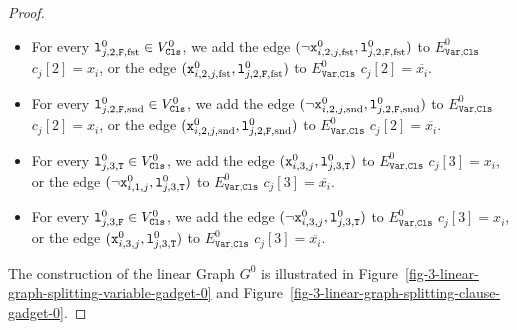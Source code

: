 \begin{proof}
\begin{itemize}
      \item
      For every $\texttt{l}^{0}_{j, 2, \texttt{F}, \text{fst}} \in V^{0}_{\texttt{Cls}}$, we add
      the edge $(\neg\texttt{x}^{0}_{i,2,j,\text{fst}}, \texttt{l}^{0}_{j, 2, \texttt{F}, \text{fst}})$
      to $E^{0}_{\texttt{Var},\texttt{Cls}}$
      $c_{j}[2] = x_{i}$, or
      the edge $(\texttt{x}^{0}_{i,2,j,\text{fst}}, \texttt{l}^{0}_{j, 2, \texttt{F}, \text{fst}})$
      to $E^{0}_{\texttt{Var},\texttt{Cls}}$
      $c_{j}[2] = \overline{x_{i}}$.

      \item
      For every $\texttt{l}^{0}_{j, 2, \texttt{F}, \text{snd}} \in V^{0}_{\texttt{Cls}}$, we add
      the edge $(\neg\texttt{x}^{0}_{i,2,j,\text{snd}}, \texttt{l}^{0}_{j, 2, \texttt{F}, \text{snd}})$
      to $E^{0}_{\texttt{Var},\texttt{Cls}}$
      $c_{j}[2] = x_{i}$, or
      the edge $(\texttt{x}^{0}_{i,2,j,\text{snd}}, \texttt{l}^{0}_{j, 2, \texttt{F}, \text{snd}})$
      to $E^{0}_{\texttt{Var},\texttt{Cls}}$
      $c_{j}[2] = \overline{x_{i}}$.

      \item
      For every $\texttt{l}^{0}_{j, 3, \texttt{T}} \in V^{0}_{\texttt{Cls}}$,
      we add
      the edge $(\texttt{x}^{0}_{i,3,j}, \texttt{l}^{0}_{j, 3, \texttt{T}})$
      to $E^{0}_{\texttt{Var},\texttt{Cls}}$
      $c_{j}[3] = x_{i}$, or
      the edge $(\neg\texttt{x}^{0}_{i,1,j}, \texttt{l}^{0}_{j, 3, \texttt{T}})$
      to $E^{0}_{\texttt{Var},\texttt{Cls}}$
      $c_{j}[3] = \overline{x_{i}}$.

      \item
      For every $\texttt{l}^{0}_{j, 3, \texttt{F}} \in V^{0}_{\texttt{Cls}}$,
      we add
      the edge $(\neg\texttt{x}^{0}_{i,3,j}, \texttt{l}^{0}_{j, 3, \texttt{T}})$
      to $E^{0}_{\texttt{Var},\texttt{Cls}}$
      $c_{j}[3] = x_{i}$, or
      the edge $(\texttt{x}^{0}_{i,3,j}, \texttt{l}^{0}_{j, 3, \texttt{T}})$
      to $E^{0}_{\texttt{Var},\texttt{Cls}}$
      $c_{j}[3] = \overline{x_{i}}$.
    \end{itemize}
  
  \medskip

  The construction of the linear Graph $G^{0}$ is illustrated
  in Figure~\ref{fig-3-linear-graph-splitting-variable-gadget-0} and
  Figure~\ref{fig-3-linear-graph-splitting-clause-gadget-0}.

  

  


\end{proof}
